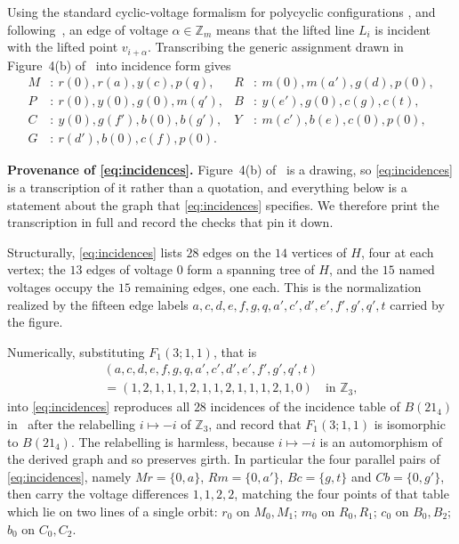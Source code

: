\documentclass[11pt]{amsart}
\theoremstyle{remark}
\newcommand{\Z}{\mathbb Z}
\begin{document}
Using the standard cyclic-voltage formalism for polycyclic
configurations \cite{BP}, and following~\cite[Sec.~2]{BGP}, an edge of
voltage $\alpha\in\Z_m$ means that the lifted line $L_i$ is incident with
the lifted point $v_{i+\alpha}$. Transcribing the generic assignment drawn in
Figure~4(b) of~\cite{BGP} into incidence form gives
\begin{equation}\label{eq:incidences}
\begin{aligned}
M&:\ r(0),r(a),y(c),p(q),
& R&:\ m(0),m(a'),g(d),p(0),\\
P&:\ r(0),y(0),g(0),m(q'),
& B&:\ y(e'),g(0),c(g),c(t),\\
C&:\ y(0),g(f'),b(0),b(g'),
& Y&:\ m(c'),b(e),c(0),p(0),\\
G&:\ r(d'),b(0),c(f),p(0).
\end{aligned}
\end{equation}

\medskip
\noindent\textbf{Provenance of \eqref{eq:incidences}.}
Figure~4(b) of~\cite{BGP} is a drawing, so \eqref{eq:incidences} is a
transcription of it rather than a quotation, and everything below is a
statement about the graph that \eqref{eq:incidences} specifies. We therefore
print the transcription in full and record the checks that pin it down.

Structurally, \eqref{eq:incidences} lists $28$ edges on the $14$ vertices of
$H$, four at each vertex; the $13$ edges of voltage $0$ form a spanning tree
of $H$, and the $15$ named voltages occupy the $15$ remaining edges, one
each. This is the normalization realized by the fifteen edge labels
$a,c,d,e,f,g,q,a',c',d',e',f',g',q',t$ carried by the figure.

Numerically, substituting $F_1(3;1,1)$, that is
\begin{multline*}
(a,c,d,e,f,g,q,a',c',d',e',f',g',q',t)\\
=(1,2,1,1,1,2,1,1,2,1,1,1,2,1,0)\quad\text{in }\Z_3,
\end{multline*}
into \eqref{eq:incidences} reproduces all $28$ incidences of the incidence
table of $B(21_4)$ in~\cite[Table~1]{BGP} after the relabelling
$i\mapsto-i$ of $\Z_3$, and \cite{BGP} record that $F_1(3;1,1)$ is isomorphic
to $B(21_4)$. The relabelling is harmless, because $i\mapsto-i$
is an automorphism of the derived graph and so preserves girth. In particular
the four parallel pairs of
\eqref{eq:incidences}, namely $Mr=\{0,a\}$, $Rm=\{0,a'\}$, $Bc=\{g,t\}$ and
$Cb=\{0,g'\}$, then carry the voltage differences $1,1,2,2$, matching the
four points of that table which lie on two lines of a single orbit: $r_0$ on
$M_0,M_1$; $m_0$ on $R_0,R_1$; $c_0$ on $B_0,B_2$; $b_0$ on $C_0,C_2$.
\end{document}
